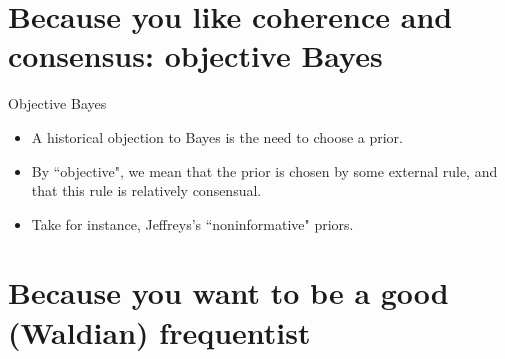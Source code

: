 \documentclass[10pt]{beamer}
\begin{document}

\section{Because you like coherence and consensus: objective Bayes}
\begin{frame}{Objective Bayes}
\begin{itemize}
\item A historical objection to Bayes is the need to choose a prior.
\item By ``objective", we mean that the prior is chosen by some external rule, and that this rule is relatively consensual.
\item Take for instance, Jeffreys's ``noninformative" priors.
\blank
\end{itemize}
\end{frame}

\section{Because you want to be a good (Waldian) frequentist}
\end{document}
